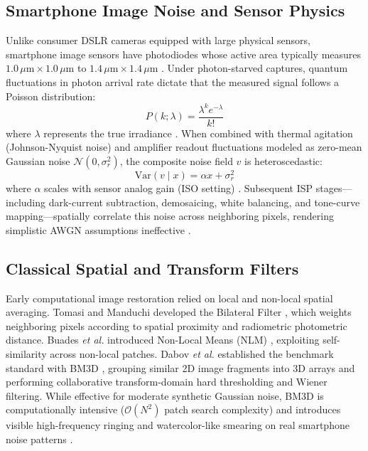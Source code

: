 \documentclass{ieeeaccess}
\begin{document}
\subsection{Smartphone Image Noise and Sensor Physics}
Unlike consumer DSLR cameras equipped with large physical sensors, smartphone image sensors have photodiodes whose active area typically measures $1.0\,\mu\text{m} \times 1.0\,\mu\text{m}$ to $1.4\,\mu\text{m} \times 1.4\,\mu\text{m}$ \cite{barron2022mip, abdelhamed2018high}. Under photon-starved captures, quantum fluctuations in photon arrival rate dictate that the measured signal follows a Poisson distribution:
\begin{equation}
P(k; \lambda) = \frac{\lambda^k e^{-\lambda}}{k!}
\end{equation}
where $\lambda$ represents the true irradiance \cite{milanfar2013tour}. When combined with thermal agitation (Johnson-Nyquist noise) and amplifier readout fluctuations modeled as zero-mean Gaussian noise $\mathcal{N}(0, \sigma_r^2)$, the composite noise field $v$ is heteroscedastic:
\begin{equation}
\text{Var}(v \mid x) = \alpha x + \sigma_r^2
\end{equation}
where $\alpha$ scales with sensor analog gain (ISO setting) \cite{foi2008practical}. Subsequent ISP stages---including dark-current subtraction, demosaicing, white balancing, and tone-curve mapping---spatially correlate this noise across neighboring pixels, rendering simplistic AWGN assumptions ineffective \cite{plotz2017benchmarking}.

\subsection{Classical Spatial and Transform Filters}
Early computational image restoration relied on local and non-local spatial averaging. Tomasi and Manduchi developed the Bilateral Filter \cite{tomasi1998bilateral}, which weights neighboring pixels according to spatial proximity and radiometric photometric distance. Buades \textit{et al.} introduced Non-Local Means (NLM) \cite{buades2005non}, exploiting self-similarity across non-local patches. Dabov \textit{et al.} established the benchmark standard with BM3D \cite{dabov2007image}, grouping similar 2D image fragments into 3D arrays and performing collaborative transform-domain hard thresholding and Wiener filtering. While effective for moderate synthetic Gaussian noise, BM3D is computationally intensive ($\mathcal{O}(N^2)$ patch search complexity) and introduces visible high-frequency ringing and watercolor-like smearing on real smartphone noise patterns \cite{lebrun2012secrets}.
\end{document}
